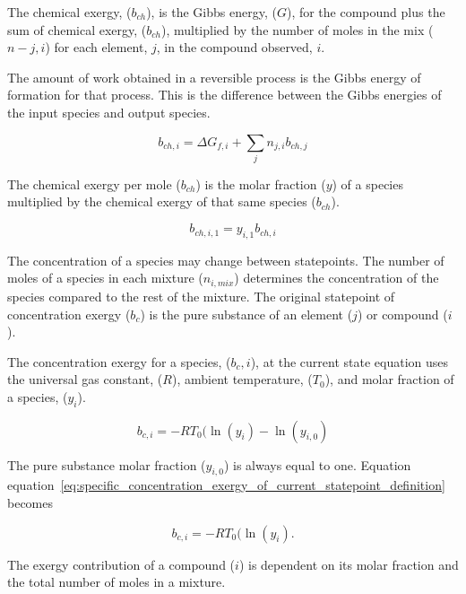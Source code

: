 \documentclass[energies,article,submit,pdftex,moreauthors]{Definitions/mdpi}
\begin{document}
The chemical exergy, ($b_{ch}$), is the Gibbs energy, ($G$), for the compound
plus the sum of chemical exergy, ($b_{ch}$),
multiplied by the number of moles
in the mix ($n-{j,i}$) for each element, $j$,
in the compound observed, $i$.

The amount of work obtained
in a reversible process is the Gibbs energy
of formation for that process.
This is the difference between the Gibbs energies
of the input species and output species.

\begin{equation}\label{eq:specific_chemical_exergy_definition}
  b_{ch,i} = \Delta{G_{f,i}} + \sum_{j}{n_{j,i}b_{ch,j}}
\end{equation}

The chemical exergy per mole ($b_{ch}$) is the molar fraction ($y$)
of a species multiplied by the chemical exergy of that same species ($b_{ch}$).

\begin{equation}\label{eq:chemical_exergy_state_point1}
  b_{ch,i,1} = y_{i,1}b_{ch,i}
\end{equation}

The concentration of a species
may change between statepoints.
The number of moles of a species in each mixture ($n_{i,mix}$)
determines the concentration of the species
compared to the rest of the mixture.
The original statepoint of concentration exergy ($b_c$) is the pure substance
of an element ($j$) or compound ($i$).

The concentration exergy for a species, ($b_c,i$),
at the current state
equation uses the universal gas constant, ($R$),
ambient temperature, ($T_0$),
and molar fraction of a species, ($y_i$).

\begin{equation}\label{eq:specific_concentration_exergy_of_current_statepoint_definition}
  b_{c,i} = -RT_{0}(\ln(y_{i}) - \ln(y_{i,0})
\end{equation}

The pure substance molar fraction ($y_{i,0}$) is always equal to one.
Equation equation~\ref{eq:specific_concentration_exergy_of_current_statepoint_definition} becomes

\begin{equation}\label{eq:specific_concentration_exergy_of_current_statepoint_definition}
  b_{c,i} = -RT_{0}(\ln(y_{i}).
\end{equation}

The exergy contribution of a compound ($i$) is dependent
on its molar fraction
and the total number of moles
in a mixture.
\end{document}
